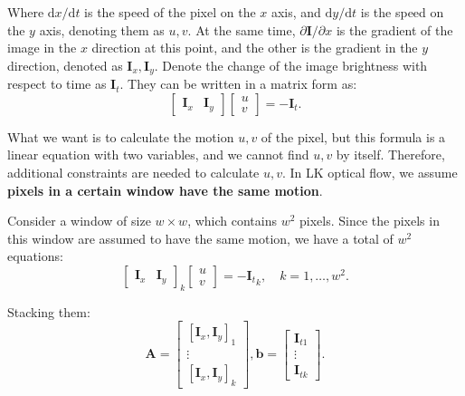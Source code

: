 Where $\mathrm{d}x / \mathrm{d}t$ is the speed of the pixel on the $x$ axis, and $\mathrm{d}y/\mathrm{d}t$ is the speed on the $y$ axis, denoting them as $u,v$. At the same time, $\partial \mathbf{I}/{\partial x}$ is the gradient of the image in the $x$ direction at this point, and the other is the gradient in the $y$ direction, denoted as $\mathbf{I} _x, \mathbf{I}_y$. Denote the change of the image brightness with respect to time as $\mathbf{I}_t$. They can be written in a matrix form as:
\begin{equation}
\left[ {\begin{array}{*{20}{c}}
	{{ \mathbf{I}_x}}&{{ \mathbf{I}_y}}
	\end{array}} \right]\left[ \begin{array}{l}
u\\
v
\end{array} \right] =  - {\mathbf{I}_t}.
\end{equation}

What we want is to calculate the motion $u,v$ of the pixel, but this formula is a linear equation with two variables, and we cannot find $u,v$ by itself. Therefore, additional constraints are needed to calculate $u,v$. In LK optical flow, we assume \textbf{pixels in a certain window have the same motion}.

Consider a window of size $w \times w$, which contains $w^2$ pixels. Since the pixels in this window are assumed to have the same motion, we have a total of $w^2$ equations:
\begin{equation}
\left[ {\begin{array}{*{20}{c}}
	{{ \mathbf{I}_x}}&{{ \mathbf{I}_y}}
	\end{array}} \right]_k
\left[ \begin{array}{l}
u\\
v
\end{array} \right] =  - {\mathbf{I}_t}_k, \quad k=1, \ldots, w^2.
\end{equation}

Stacking them:
\begin{equation}
\mathbf{A} = \left[ {\begin{array}{*{20}{c}}
	{{{\left[ {{\mathbf{I}_x},{\mathbf{I}_y}} \right]}_1}}\\
	\vdots \\
	{{{\left[ {{\mathbf{I}_x},{\mathbf{I}_y}} \right]}_k}}
	\end{array}} \right],\mathbf{b} = \left[ {\begin{array}{*{20}{c}}
	{{ \mathbf{I}_{t1}}}\\
	\vdots \\
	{{ \mathbf{I}_{tk}}}
	\end{array}} \right].
\end{equation}

